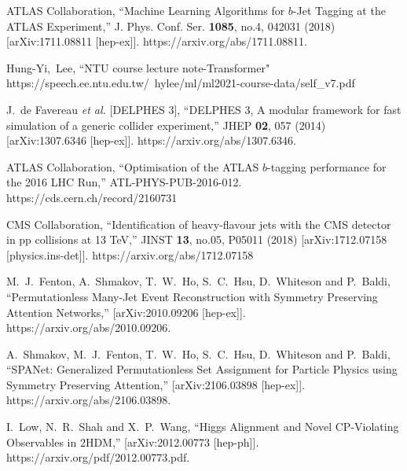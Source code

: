 \begin{thebibliography}{99}
ATLAS Collaboration,
``Machine Learning Algorithms for $b$-Jet Tagging at the ATLAS Experiment,''
J. Phys. Conf. Ser. \textbf{1085}, no.4, 042031 (2018)
[arXiv:1711.08811 [hep-ex]].
https://arxiv.org/abs/1711.08811.

Hung-Yi,~Lee,
``NTU course lecture note-Transformer"
https://speech.ee.ntu.edu.tw/~hylee/ml/ml2021-course-data/self\_v7.pdf

J.~de Favereau \textit{et al.} [DELPHES 3],
``DELPHES 3, A modular framework for fast simulation of a generic collider experiment,''
JHEP \textbf{02}, 057 (2014)
[arXiv:1307.6346 [hep-ex]].
https://arxiv.org/abs/1307.6346.

ATLAS Collaboration,
``Optimisation of the ATLAS $b$-tagging performance for the 2016 LHC Run,''
ATL-PHYS-PUB-2016-012.
https://cds.cern.ch/record/2160731

CMS Collaboration,
``Identification of heavy-flavour jets with the CMS detector in pp collisions at 13 TeV,''
JINST \textbf{13}, no.05, P05011 (2018)
[arXiv:1712.07158 [physics.ins-det]].
https://arxiv.org/abs/1712.07158

M.~J.~Fenton, A.~Shmakov, T.~W.~Ho, S.~C.~Hsu, D.~Whiteson and P.~Baldi,
``Permutationless Many-Jet Event Reconstruction with Symmetry Preserving Attention Networks,''
[arXiv:2010.09206 [hep-ex]].
https://arxiv.org/abs/2010.09206.

A.~Shmakov, M.~J.~Fenton, T.~W.~Ho, S.~C.~Hsu, D.~Whiteson and P.~Baldi,
``SPANet: Generalized Permutationless Set Assignment for Particle Physics using Symmetry Preserving Attention,''
[arXiv:2106.03898 [hep-ex]].
https://arxiv.org/abs/2106.03898.

I.~Low, N.~R.~Shah and X.~P.~Wang,
``Higgs Alignment and Novel CP-Violating Observables in 2HDM,''
[arXiv:2012.00773 [hep-ph]].
https://arxiv.org/pdf/2012.00773.pdf.

\end{thebibliography}
\newpage
